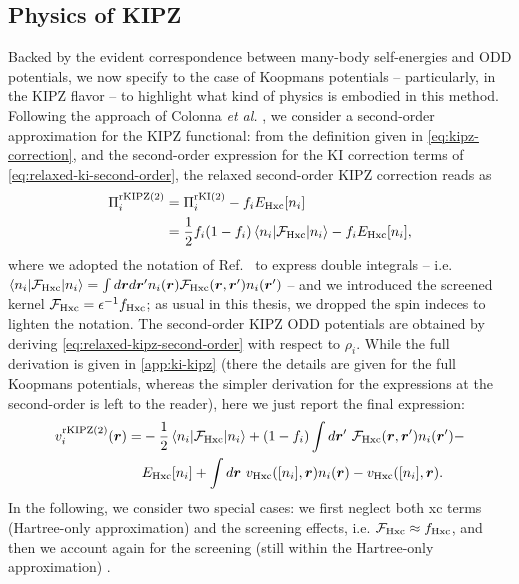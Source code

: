 \subsection{Physics of KIPZ\label{sec:kipz-cohsex}}
Backed by the evident correspondence between many-body self-energies and ODD potentials, we now specify to the case of Koopmans potentials -- particularly, in the KIPZ flavor -- to highlight what kind of physics is embodied in this method. Following the approach of Colonna \emph{et al.} \cite{colonna_koopmans-compliant_2019}, we consider a second-order approximation for the KIPZ functional: from the definition given in \cref{eq:kipz-correction}, and the second-order expression for the KI correction terms of \cref{eq:relaxed-ki-second-order}, the relaxed second-order KIPZ correction reads as
%
\begin{equation}
    \begin{split}
        \Pi_i^{\rm rKIPZ(2)} &= \Pi_i^{\rm rKI(2)} - f_i E_{\rm Hxc}[n_i] \\
        &= \frac{1}{2} f_i(1-f_i) \braket{n_i|\mathcal{F_{\rm Hxc}}|n_i} - f_i E_{\rm Hxc}[n_i] ,
    \end{split}
    \label{eq:relaxed-kipz-second-order}
\end{equation}
%
where we adopted the notation of Ref.~\cite{colonna_koopmans-compliant_2019} to express double integrals -- i.e. $\braket{n_i|\mathcal{F_{\rm Hxc}}|n_i} = \int d{\bm r} d{\bm r}' n_i({\bm r}) \mathcal{F}_{\rm Hxc}({\bm r},{\bm r}') n_i({\bm r}')$ -- and we introduced the screened kernel $\mathcal{F}_{\rm Hxc} = \epsilon^{-1} f_{\rm Hxc}$; as usual in this thesis, we dropped the spin indeces to lighten the notation. The second-order KIPZ ODD potentials are obtained by deriving \cref{eq:relaxed-kipz-second-order} with respect to $\rho_i$. While the full derivation is given in \cref{app:ki-kipz} (there the details are given for the full Koopmans potentials, whereas the simpler derivation for the expressions at the second-order is left to the reader), here we just report the final expression:
%
\begin{equation}
    \begin{split}
        v^{\rm rKIPZ(2)}_i(\br) = &- \frac{1}{2} \braket{n_i|\mathcal{F}_{\rm Hxc}|n_i} + (1-f_i) \int d\br' \ \mathcal{F}_{\rm Hxc}(\br,\br') n_i(\br') - \\
        & E_{\rm Hxc}[n_i] + \int d\br \ v_{\rm Hxc}([n_i],\br) n_i(\br) - v_{\rm Hxc}([n_i],\br) .
    \end{split}
    \label{eq:kipz-potential-second-order}
\end{equation}
%
In the following, we consider two special cases: we first neglect both xc terms (Hartree-only approximation) and the screening effects, i.e. $\mathcal{F}_{\rm Hxc} \approx f_{\rm Hxc}$, and then we account again for the screening (still within the Hartree-only approximation) \cite{colonna_koopmans-compliant_2019}.


